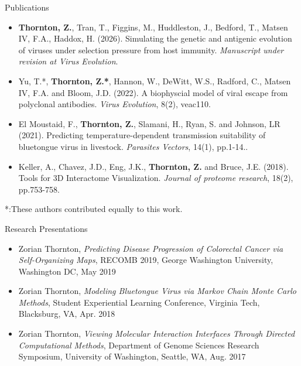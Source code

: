 \documentclass{resume} %
\begin{document}
\begin{rSection}{Publications}

\begin{itemize}

    \item \textbf{Thornton, Z.}, Tran, T., Figgins, M., Huddleston, J., Bedford, T., Matsen IV, F.A., Haddox, H. (2026). Simulating the genetic and antigenic evolution of viruses under selection pressure from host immunity.   \emph{Manuscript under revision at Virus Evolution}.

    \item Yu, T.*, \textbf{Thornton, Z.*}, Hannon, W., DeWitt, W.S., Radford, C., Matsen IV, F.A. and Bloom, J.D. (2022). A biophyscial model of viral escape from polyclonal antibodies. \emph{Virus Evolution}, 8(2), veac110.

    \item El Moustaid, F., \textbf{Thornton, Z.}, Slamani, H., Ryan, S. and Johnson, LR (2021). Predicting temperature-dependent transmission suitability of bluetongue virus in livestock. \emph{Parasites Vectors}, 14(1), pp.1-14..

    \item Keller, A., Chavez, J.D., Eng, J.K., \textbf{Thornton, Z.} and Bruce, J.E. (2018). Tools for 3D Interactome Visualization. \emph{Journal of proteome research}, 18(2), pp.753-758.
\end{itemize}

*:These authors contributed equally to this work.
\end{rSection}

\begin{rSection}{Research Presentations}
\begin{itemize}

    \item Zorian Thornton, \textit{Predicting Disease Progression of Colorectal Cancer via Self-Organizing Maps}, RECOMB 2019, George Washington University, Washington DC, May 2019

    \item Zorian Thornton, \textit{Modeling Bluetongue Virus via Markov Chain Monte Carlo Methods}, Student Experiential Learning Conference, Virginia Tech, Blacksburg, VA, Apr. 2018

    \item Zorian Thornton, \textit{Viewing Molecular Interaction Interfaces Through Directed Computational Methods}, Department of Genome Sciences Research Symposium, University of Washington, Seattle, WA, Aug. 2017

\end{itemize}


\end{rSection}
\end{document}
